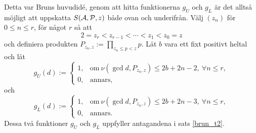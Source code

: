Detta var Bruns huvudidé, genom att hitta funktionerna $g_U$ och $g_L$ är det alltså möjligt att uppskatta $\S{A}{P}{z}$ både ovan och underifrån. Välj $(z_n)$ för $0 \leq n \leq r$, för något $r$ så att
\begin{equation*}
    2 = z_r < z_{r-1} < \cdots < z_1 < z_0 = z
\end{equation*}
och definiera produkten $P_{z_n, z} := \prod_{z_n \leq p < z} p$. Låt $b$ vara ett fixt positivt heltal och låt
\begin{equation*}
    g_U(d) :=
    \begin{cases}
        1, & \text{om}\ \nu(\gcd{d, P_{z_n, z}}) \leq 2b+2n-2,\ \forall n \leq r, \\
        0, & \text{annars,}
    \end{cases}
\end{equation*}
och
\begin{equation*}
    g_L(d) :=
    \begin{cases}
        1, & \text{om}\ \nu(\gcd{d, P_{z_n, z}}) \leq 2b+2n-3,\ \forall n \leq r, \\
        0, & \text{annars.}
    \end{cases}
\end{equation*}
Dessa två funktioner $g_U$ och $g_L$ uppfyller antagandena i sats \ref{brun_t2}.